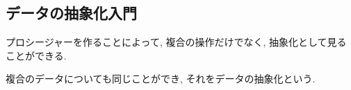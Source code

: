 \subsection{データの抽象化入門}
プロシージャーを作ることによって, 複合の操作だけでなく,
抽象化として見ることができる.

複合のデータについても同じことができ, それをデータの抽象化という.
